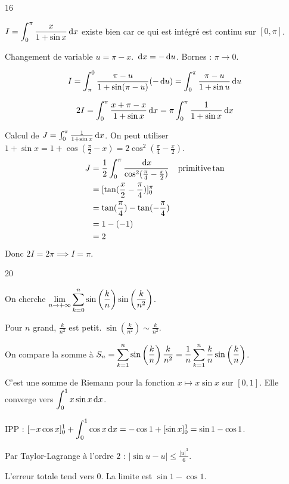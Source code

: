 \begin{correction}{16}

    $\displaystyle I = \int_0^\pi \frac{x}{1+\sin x} \,\mathrm{d}x$ existe bien car ce qui est intégré est continu sur $[0,\pi]$.

    Changement de variable $u = \pi - x$. $\,\mathrm{d}x = -\,\mathrm{d} u$.
    Bornes : $\pi \to 0$.
    
    $$I = \int_\pi^0 \frac{\pi-u}{1+\sin(\pi-u)} (-\,\mathrm{d} u) = \int_0^\pi \frac{\pi-u}{1+\sin u} \,\mathrm{d} u$$

    $$2I = \int_0^\pi \frac{x + \pi - x}{1+\sin x} \,\mathrm{d}x = \pi \int_0^\pi \frac{1}{1+\sin x} \,\mathrm{d}x$$

    Calcul de $J = \int_0^\pi \frac{1}{1+\sin x} \,\mathrm{d}x$.
    On peut utiliser $1+\sin x = 1 + \cos(\frac{\pi}{2}-x) = 2 \cos^2(\frac{\pi}{4}-\frac{x}{2})$.
    \begin{align*}
        J &= \frac{1}{2} \int_0^\pi \frac{\,\mathrm{d} x}{\cos^2(\frac{\pi}{4}-\frac{x}{2})} &\text{primitive} \tan \\
          &= [\tan(\frac{x}{2}-\frac{\pi}{4})]_0^\pi \\
          &= \tan(\frac{\pi}{4}) - \tan(-\frac{\pi}{4}) \\
          &= 1 - (-1) \\
          &= 2
    \end{align*}
    Donc $2I = 2\pi \implies I = \pi$.
\end{correction}

\begin{correction}{20}

    On cherche $\displaystyle \lim_{n\to + \infty} \sum_{k=0}^n \sin\left(\frac k n\right) \sin\left(\frac k {n^2}\right)$.

    Pour $n$ grand, $\frac k {n^2}$ est petit. $\sin\left(\frac k {n^2}\right) \sim \frac k {n^2}$.

    On compare la somme à $\displaystyle S_n = \sum_{k=1}^n \sin\left(\frac k n\right) \frac{k}{n^2} = \frac{1}{n} \sum_{k=1}^n \frac{k}{n} \sin\left(\frac{k}{n}\right)$.

    C'est une somme de Riemann pour la fonction $x \mapsto x \sin x$ sur $[0,1]$.
    Elle converge vers $\displaystyle \int_0^1 x \sin x \,\mathrm{d}x$.

    IPP : $\displaystyle [-x\cos x]_0^1 + \int_0^1 \cos x \,\mathrm{d}x = -\cos 1 + [\sin x]_0^1 = \sin 1 - \cos 1$.

    Par Taylor-Lagrange à l'ordre $2$ : $|\sin u - u| \le \frac{|u|^3}{6}$.

    L'erreur totale tend vers 0. La limite est $\sin 1 - \cos 1$.
\end{correction}

